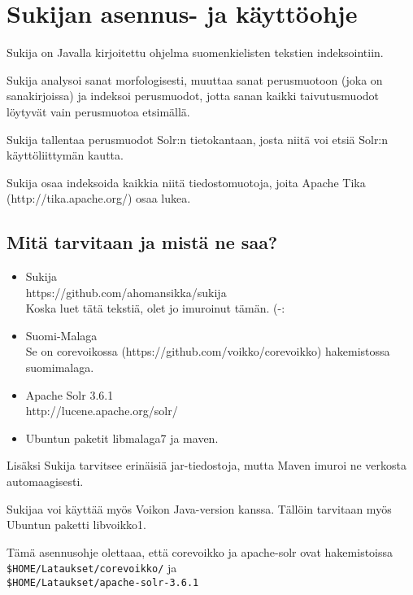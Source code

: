 \documentclass[12pt,a4paper]{scrartcl}
\begin{document}
\pagestyle{fancy}
\setlength{\parindent}{0pt}
\setlength{\parskip}{1ex plus 0.5ex minus 0.2ex}
\section*{Sukijan asennus- ja käyttöohje}

Sukija on Javalla kirjoitettu ohjelma suomenkielisten tekstien
indeksointiin.

Sukija analysoi sanat morfologisesti, muuttaa sanat perusmuotoon (joka
on sanakirjoissa) ja indeksoi perusmuodot, jotta sanan kaikki
taivutusmuodot löytyvät vain perusmuotoa etsimällä.

Sukija tallentaa perusmuodot Solr:n tietokantaan, josta niitä voi
etsiä Solr:n käyttöliittymän kautta.

Sukija osaa indeksoida kaikkia niitä tiedostomuotoja, joita Apache
Tika \\(http://tika.apache.org/) osaa lukea.

\subsection*{Mitä tarvitaan ja mistä ne saa?}

\begin{itemize}

\item Sukija \\
      https://github.com/ahomansikka/sukija \\
      Koska luet tätä tekstiä, olet jo imuroinut tämän. (-:

\item Suomi-Malaga \\
      Se on corevoikossa (https://github.com/voikko/corevoikko)
      hakemistossa \\
      suomimalaga.

\item Apache Solr 3.6.1 \\
      http://lucene.apache.org/solr/

\item Ubuntun paketit libmalaga7 ja maven.
\end{itemize}

Lisäksi Sukija tarvitsee erinäisiä jar-tiedostoja, mutta Maven imuroi
ne verkosta automaagisesti.

Sukijaa voi käyttää myös Voikon Java-version kanssa. Tällöin tarvitaan
myös Ubuntun paketti libvoikko1.

Tämä asennusohje olettaaa, että corevoikko ja apache-solr ovat hakemistoissa \\
\verb=$HOME/Lataukset/corevoikko/= ja \\
\verb=$HOME/Lataukset/apache-solr-3.6.1=
\end{document}
